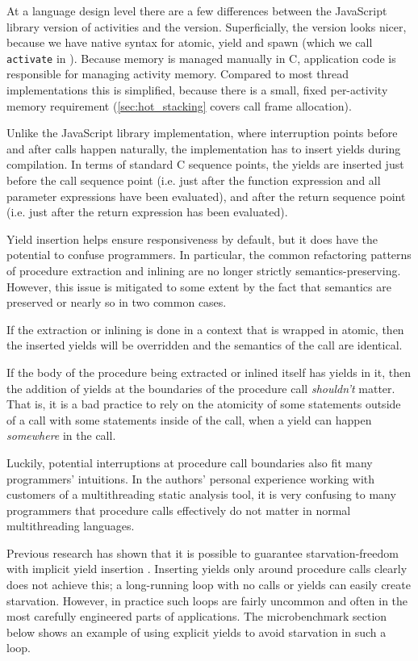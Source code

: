 \documentclass[acmsmall,anonymous,review]{acmart}\settopmatter{printfolios=true,printccs=false,printacmref=false}
\begin{document}
At a language design level there are a few differences between the JavaScript library version of activities and the \charcoal{} version.
Superficially, the \charcoal{} version looks nicer, because we have native syntax for atomic, yield and spawn (which we call \texttt{activate} in \charcoal{}).
Because memory is managed manually in C, application code is responsible for managing activity memory.
Compared to most thread implementations this is simplified, because there is a small, fixed per-activity memory requirement (\textsection\ref{sec:hot_stacking} covers call frame allocation).

Unlike the JavaScript library implementation, where interruption points before and after calls happen naturally, the \charcoal{} implementation has to insert yields during compilation.
In terms of standard C sequence points, the yields are inserted just before the call sequence point (i.e. just after the function expression and all parameter expressions have been evaluated), and after the return sequence point (i.e. just after the return expression has been evaluated).

Yield insertion helps ensure responsiveness by default, but it does have the potential to confuse programmers.
In particular, the common refactoring patterns of procedure extraction and inlining are no longer strictly semantics-preserving.
However, this issue is mitigated to some extent by the fact that semantics are preserved or nearly so in two common cases.

If the extraction or inlining is done in a context that is wrapped in atomic, then the inserted yields will be overridden and the semantics of the call are identical.

If the body of the procedure being extracted or inlined itself has yields in it, then the addition of yields at the boundaries of the procedure call \emph{shouldn't} matter.
That is, it is a bad practice to rely on the atomicity of some statements outside of a call with some statements inside of the call, when a yield can happen \emph{somewhere} in the call.

Luckily, potential interruptions at procedure call boundaries also fit many programmers' intuitions.
In the authors' personal experience working with customers of a multithreading static analysis tool, it is very confusing to many programmers that procedure calls effectively do not matter in normal multithreading languages.

Previous research has shown that it is possible to guarantee starvation-freedom with implicit yield insertion \cite{Boudol2007}.
Inserting yields only around procedure calls clearly does not achieve this; a long-running loop with no calls or yields can easily create starvation.
However, in practice such loops are fairly uncommon and often in the most carefully engineered parts of applications.
The microbenchmark section below shows an example of using explicit yields to avoid starvation in such a loop.
\end{document}
